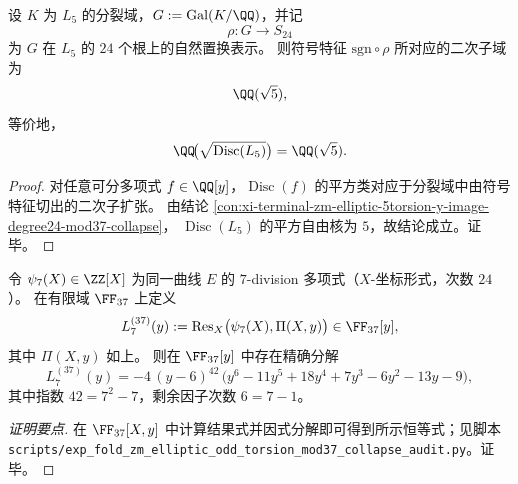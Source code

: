 \begin{corollary}[五次权除法分裂域的符号二次特征]\label{cor:xi-terminal-zm-elliptic-5torsion-sign-quadratic-field}
设 \(K\) 为 \(L_{5}\) 的分裂域，\(G:=\mathrm{Gal}(K/\QQ)\)，并记
\[
\rho:G\longrightarrow S_{24}
\]
为 \(G\) 在 \(L_{5}\) 的 \(24\) 个根上的自然置换表示。
则符号特征 \(\mathrm{sgn}\circ\rho\) 所对应的二次子域为
\[
\QQ(\sqrt5),
\]
等价地，
\[
\QQ\!\bigl(\sqrt{\operatorname{Disc}(L_{5})}\bigr)=\QQ(\sqrt5).
\]
\end{corollary}
\begin{proof}
对任意可分多项式 \(f\in\QQ[y]\)，\(\operatorname{Disc}(f)\) 的平方类对应于分裂域中由符号特征切出的二次子扩张。
由结论 \ref{con:xi-terminal-zm-elliptic-5torsion-y-image-degree24-mod37-collapse}，
\(\operatorname{Disc}(L_{5})\) 的平方自由核为 \(5\)，故结论成立。证毕。
\end{proof}

\begin{conclusion}\label{con:xi-terminal-zm-elliptic-7torsion-y-image-mod37-collapse}
令 \(\psi_{7}(X)\in\ZZ[X]\) 为同一曲线 \(E\) 的 \(7\)-division 多项式（\(X\)-坐标形式，次数 \(24\)）。
在有限域 \(\FF_{37}\) 上定义
\[
L_{7}^{(37)}(y):=\operatorname{Res}_{X}\bigl(\psi_{7}(X),\Pi(X,y)\bigr)\in\FF_{37}[y],
\]
其中 \(\Pi(X,y)\) 如上。
则在 \(\FF_{37}[y]\) 中存在精确分解
\[
L_{7}^{(37)}(y)= -4\,(y-6)^{42}\,\bigl(y^{6}-11y^{5}+18y^{4}+7y^{3}-6y^{2}-13y-9\bigr),
\]
其中指数 \(42=7^{2}-7\)，剩余因子次数 \(6=7-1\)。
\end{conclusion}
\begin{proof}[证明要点]
在 \(\FF_{37}[X,y]\) 中计算结果式并因式分解即可得到所示恒等式；见脚本 \texttt{scripts/exp\_fold\_zm\_elliptic\_odd\_torsion\_mod37\_collapse\_audit.py}。证毕。
\end{proof}


